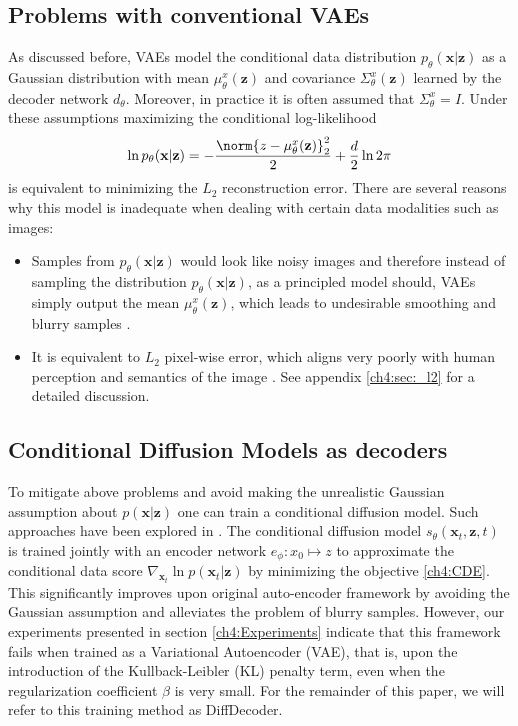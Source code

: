 \subsection{Problems with conventional VAEs}
As discussed before, VAEs model the conditional data distribution $p_\theta (\textbf{x}| \textbf{z})$ as a Gaussian distribution with mean $\mu^x_\theta( \textbf{z})$ and covariance $\Sigma^x_\theta( \textbf{z})$ learned by the decoder network $d_\theta$. Moreover, in practice it is often assumed that $\Sigma^x_\theta = I$. Under these assumptions maximizing the conditional log-likelihood $$\ln p_\theta (\textbf{x} | \textbf{z}) = -\frac{\norm{z - \mu^x_\theta( \textbf{z})}_2^2}{2} + \frac{d}{2}\ln{2\pi}$$ is equivalent to minimizing the $L_2$ reconstruction error. There are several reasons why this model is inadequate when dealing with certain data modalities such as images:
\begin{itemize}
    \item Samples from $p_\theta(\textbf{x} | \textbf{z})$ would look like noisy images and therefore instead of sampling the distribution $p_\theta(\textbf{x}| \textbf{z})$, as a principled model should, VAEs simply output the mean $\mu^x_\theta( \textbf{z})$, which leads to undesirable smoothing and blurry samples \cite{zaho2017understanding_vaes}.
    \item It is equivalent to $L_2$ pixel-wise error, which aligns very poorly with human perception and semantics of the image \cite{zhang2018lpips}. See appendix  \ref{ch4:sec:_l2} for a detailed discussion.
\end{itemize}

\subsection{Conditional Diffusion Models as decoders}
To mitigate above problems and avoid making the unrealistic Gaussian assumption about $p(\textbf{x}| \textbf{z})$ one can train a conditional diffusion model. Such approaches have been explored in \cite{preechakul2022diffusion_decoder, yang2023ldiffusion_decoder_compression}. The conditional diffusion model $s_\theta(\textbf{x}_t, \textbf{z},t)$ is trained jointly with an encoder network $e_\phi : x_0 \mapsto z$ to approximate the conditional data score $\nabla_{\textbf{x}_t}  \ln{p(\textbf{x}_t | \textbf{z})}$ by minimizing the objective \ref{ch4:CDE}. This significantly improves upon original auto-encoder framework by avoiding the Gaussian assumption and alleviates the problem of blurry samples. However, our experiments presented in section \ref{ch4:Experiments} indicate that this framework fails when trained as a Variational Autoencoder (VAE), that is, upon the introduction of the Kullback-Leibler (KL) penalty term, even when the regularization coefficient $\beta$ is very small. For the remainder of this paper, we will refer to this training method as DiffDecoder.

